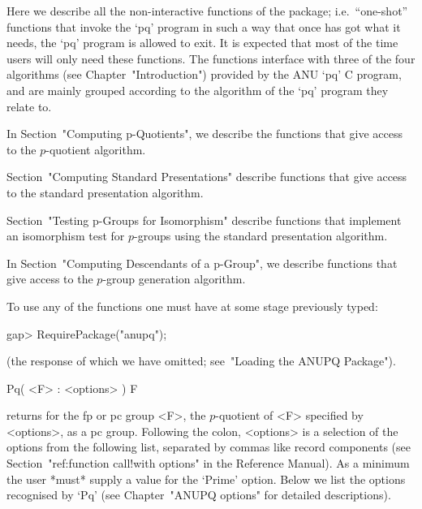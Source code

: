 

Here we describe  all  the  non-interactive  functions  of  the  {\ANUPQ}
package; i.e.~``one-shot'' functions that invoke the `pq' program in  such
a way that once {\GAP} has got what it needs, the `pq' program is  allowed
to exit. It is expected that most of the time users will only need  these
functions. The functions interface with three of the four algorithms (see
Chapter~"Introduction") provided by the  ANU  `pq'  C  program,  and  are
mainly grouped according to the algorithm of the `pq' program they  relate
to.

In Section~"Computing p-Quotients", we describe the functions  that  give
access to the $p$-quotient algorithm.

Section~"Computing Standard Presentations" describe functions  that  give
access to the standard presentation algorithm.

Section~"Testing  p-Groups  for  Isomorphism"  describe  functions   that
implement  an  isomorphism  test  for  $p$-groups  using   the   standard
presentation algorithm.

In Section~"Computing Descendants of a p-Group",  we  describe  functions
that give access to the $p$-group generation algorithm.

To use any of the functions one must have at some stage previously typed:

\beginexample
gap> RequirePackage("anupq");
\endexample

(the response of which we have omitted; see~"Loading the ANUPQ Package").


\>Pq( <F> : <options> ) F

returns for the fp or pc group <F>, the $p$-quotient of <F> specified  by
<options>, as a pc group. Following the colon, <options> is  a  selection
of the options from the following list, separated by commas  like  record
components (see Section~"ref:function call!with options"  in  the  {\GAP}
Reference Manual). As a minimum the user *must* supply a  value  for  the
`Prime' option. Below  we  list  the  options  recognised  by  `Pq'  (see
Chapter~"ANUPQ options" for detailed descriptions).

